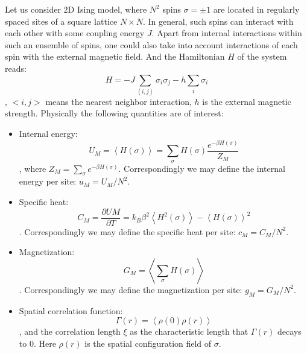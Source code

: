 \documentclass[a4paper]{article}
\begin{document}
Let us consider 2D Ising model, where $N^2$ spins $\sigma=\pm1$ are located in regularly spaced sites of a square lattice $N \times N$. In general, such spins can interact with each other with some coupling energy $J$. Apart from internal interactions within such an ensemble of spins, one could also take into account interactions of each spin with the external magnetic field. And the Hamiltonian $H$ of the system reads:
\begin{displaymath}
H=-J\sum_{\left<i,j\right>}\sigma_i\sigma_j-h\sum_i\sigma_i
\end{displaymath}
, $<i, j>$ means the nearest neighbor interaction, $h$ is the external magnetic strength. Physically the following quantities are of interest:
\begin{itemize}
    \item Internal energy:
        \begin{displaymath}
        U_M=\left<H(\sigma)\right>=\sum_{\sigma} H(\sigma)\frac{e^{-\beta H(\sigma)}}{Z_M}
        \end{displaymath}
    , where $Z_M=\sum_\sigma e^{-\beta H(\sigma)}$. Correspondingly we may define the internal energy per site: $u_M=U_M/N^2$.
    \item Specific heat:
        \begin{displaymath}
        C_M =\frac{\partial UM}{\partial T} =k_B\beta^2\left<H^2(\sigma)\right> - \left <H(\sigma)\right>^2
        \end{displaymath}
    . Correspondingly we may define the specific heat per site: $c_M = C_M/N^2$.
    \item Magnetization:
        \begin{displaymath}
        G_M = \left< \sum_\sigma H(\sigma) \right >
        \end{displaymath}
    . Correspondingly we may define the magnetization per site: $g_M = G_M/N^2$.
    \item Spatial correlation function:
        \begin{displaymath}
        \Gamma(r)=\left<\rho(0)\rho(r)\right>
        \end{displaymath}
    , and the correlation length $\xi$ as the characteristic length that $\Gamma(r)$ decays to 0. Here $\rho(r)$ is the spatial configuration field of $\sigma$. 
\end{itemize}
\end{document}
